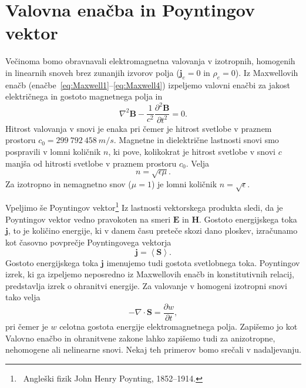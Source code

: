 \section{Valovna enačba in Poyntingov vektor}
Večinoma bomo obravnavali elektromagnetna valovanja v izotropnih, 
homogenih in linearnih snoveh brez zunanjih izvorov polja ($\mathbf{j}_e=0$ in $\rho_{e}=0$). 
Iz Maxwellovih enačb (enačbe~\ref{eq:Maxwell1}--\ref{eq:Maxwell4}) izpeljemo valovni 
enačbi za jakost električnega in gostoto magnetnega polja 
in
\begin{equation}
\label{eq:valovna-skalarna-B}
\nabla^{2}\mathbf{B}-\frac{1}{c^{2}}\frac{\partial^{2}\mathbf{B}}{\partial t^{2}} = 0.
\end{equation}
Hitrost valovanja v snovi je enaka 
pri čemer je hitrost svetlobe v praznem prostoru $c_0 = 299~792~458~\si{m/s}$. 
Magnetne in dielektrične lastnosti snovi smo pospravili
v lomni količnik $n$, ki pove, kolikokrat je hitrost 
svetlobe v snovi $c$ manjša od hitrosti svetlobe v praznem prostoru $c_0$. Velja
\begin{equation}
n=\sqrt{\epsilon\mu}.
\end{equation}
Za izotropno in nemagnetno snov ($\mu=1$) je lomni količnik $n=\sqrt{\epsilon}$.

Vpeljimo še Poyntingov 
vektor\footnote{~Angleški fizik John Henry Poynting, 1852--1914.} 
Iz lastnosti vektorskega produkta sledi, da je Poyntingov vektor vedno pravokoten na 
smeri $\mathbf{E}$ in $\mathbf{H}$. Gostoto energijskega toka $\mathbf{j}$, to je količino
energije, ki v danem času preteče skozi dano ploskev, izračunamo kot časovno 
povprečje Poyntingovega vektorja 
\begin{equation}
\mathbf{j}=\left\langle \mathbf{\mathbf{S}}\right\rangle\!.
\label{eq:jscal}
\end{equation}
Gostoto energijskega toka $\mathbf{j}$ imenujemo tudi gostota svetlobnega 
toka.
Poyntingov izrek, ki ga izpeljemo neposredno 
iz Maxwellovih enačb in konstitutivnih relacij, predstavlja izrek o ohranitvi 
energije. Za valovanje v homogeni izotropni snovi tako velja
\begin{equation}
-\nabla\cdot\mathbf{S}=\frac{\partial w}{\partial t},
\end{equation}
pri čemer je $w$ celotna
gostota energije elektromagnetnega polja. Zapišemo jo kot 
Valovno enačbo in ohranitvene zakone lahko zapišemo tudi za anizotropne,
nehomogene ali nelinearne snovi. Nekaj teh primerov bomo srečali v nadaljevanju.

